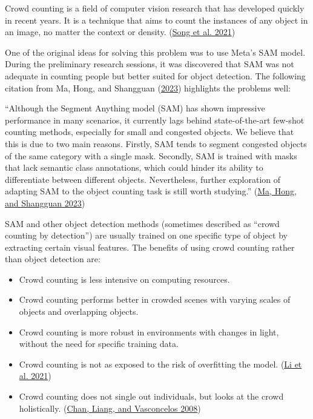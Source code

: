\documentclass[
]{article}
\begin{document}
Crowd counting is a field of computer vision research that has developed
quickly in recent years. It is a technique that aims to count the
instances of any object in an image, no matter the context or density.
(\protect\hyperlink{ref-sasnet}{Song et al. 2021})

One of the original ideas for solving this problem was to use Meta's SAM
model. During the preliminary research sessions, it was discovered that
SAM was not adequate in counting people but better suited for object
detection. The following citation from Ma, Hong, and Shangguan
(\protect\hyperlink{ref-ma2023sam}{2023}) highlights the problems well:

``Although the Segment Anything model (SAM) has shown impressive
performance in many scenarios, it currently lags behind state-of-the-art
few-shot counting methods, especially for small and congested objects.
We believe that this is due to two main reasons. Firstly, SAM tends to
segment congested objects of the same category with a single mask.
Secondly, SAM is trained with masks that lack semantic class
annotations, which could hinder its ability to differentiate between
different objects. Nevertheless, further exploration of adapting SAM to
the object counting task is still worth studying.''
(\protect\hyperlink{ref-ma2023sam}{Ma, Hong, and Shangguan 2023})

SAM and other object detection methods (sometimes described as ``crowd
counting by detection'') are usually trained on one specific type of
object by extracting certain visual features. The benefits of using
crowd counting rather than object detection are:

\begin{itemize}
\item
  Crowd counting is less intensive on computing resources.
\item
  Crowd counting performs better in crowded scenes with varying scales
  of objects and overlapping objects.
\item
  Crowd counting is more robust in environments with changes in light,
  without the need for specific training data.
\item
  Crowd counting is not as exposed to the risk of overfitting the model.
  (\protect\hyperlink{ref-li2021approaches}{Li et al. 2021})
\item
  Crowd counting does not single out individuals, but looks at the crowd
  holistically. (\protect\hyperlink{ref-chan2008}{Chan, Liang, and
  Vasconcelos 2008})
\end{itemize}
\end{document}
